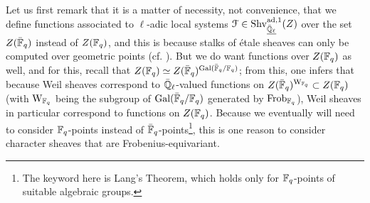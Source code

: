             \begin{remark} \label{remark: why_are_character_sheaves_weil_sheaves}
                Let us first remark that it is a matter of necessity, not convenience, that we define functions associated to $\ell$-adic local systems $\mathcal{F} \in \mathrm{Shv}_{\underline{\bar{\mathbb{Q}}_{\ell}}}^{\mathrm{ad}, 1}(Z)$ over the set $Z(\bar{\mathbb{F}}_q)$ instead of $Z(\mathbb{F}_q)$, and this is because stalks of \'etale sheaves can only be computed over geometric points (cf. \cite[\href{https://stacks.math.columbia.edu/tag/03PN}{Tag 03PN}]{stacks}). But we do want functions over $Z(\mathbb{F}_q)$ as well, and for this, recall that $Z(\mathbb{F}_q) \simeq Z(\bar{\mathbb{F}}_q)^{\mathrm{Gal}(\bar{\mathbb{F}}_q/\mathbb{F}_q)}$; from this, one infers that because Weil sheaves correspond to $\bar{\mathbb{Q}}_{\ell}$-valued functions on $Z(\bar{\mathbb{F}}_q)^{\mathrm{W}_{\mathbb{F}_q}} \subset Z(\mathbb{F}_q)$ (with $\mathrm{W}_{\mathbb{F}_q}$ being the subgroup of $\mathrm{Gal}(\bar{\mathbb{F}}_q/\mathbb{F}_q)$ generated by $\mathrm{Frob}_{\mathbb{F}_q}$), Weil sheaves in particular correspond to functions on $Z(\mathbb{F}_q)$. Because we eventually will need to consider $\mathbb{F}_q$-points instead of $\bar{\mathbb{F}}_q$-points\footnote{The keyword here is Lang's Theorem, which holds only for $\mathbb{F}_q$-points of suitable algebraic groups.}, this is one reason to consider character sheaves that are Frobenius-equivariant.
            \end{remark}
            
